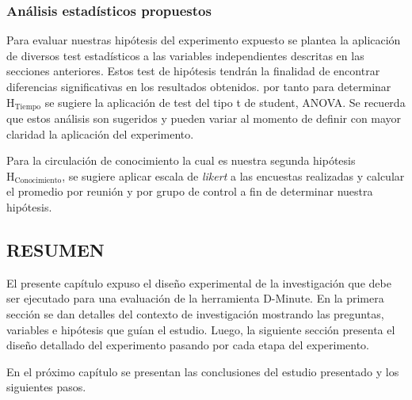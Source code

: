 \subsubsection{Análisis estadísticos propuestos}

Para evaluar nuestras hipótesis del experimento expuesto se plantea la aplicación de diversos test estadísticos a las variables independientes descritas en las secciones anteriores. Estos test de hipótesis tendrán la finalidad de encontrar diferencias significativas en los resultados obtenidos. por tanto para determinar $\mathrm{H_{Tiempo}}$ se sugiere la aplicación de test del tipo t de student, ANOVA. Se recuerda que estos análisis son sugeridos y pueden variar al momento de definir con mayor claridad la aplicación del experimento. 

Para la circulación de conocimiento la cual es nuestra segunda hipótesis $\mathrm{H_{Conocimiento}}$, se sugiere aplicar escala de \textit{likert} a las encuestas realizadas y calcular el promedio por reunión y por grupo de control a fin de determinar nuestra hipótesis.

\subsection{RESUMEN}

El presente capítulo expuso el diseño experimental de la investigación que debe ser ejecutado para una evaluación de la herramienta D-Minute. En la primera sección se dan detalles del contexto de investigación mostrando las preguntas, variables e hipótesis que guían el estudio. Luego, la siguiente sección presenta el diseño detallado del experimento pasando por cada etapa del experimento. 

En el próximo capítulo se presentan las conclusiones del estudio presentado y los siguientes pasos.
